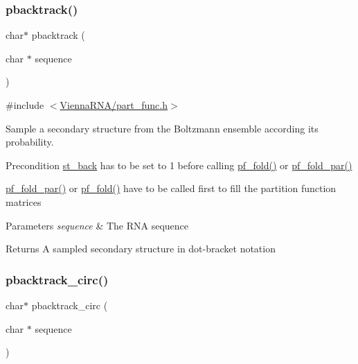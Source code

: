 \subsubsection{\texorpdfstring{pbacktrack()}{pbacktrack()}}
{\footnotesize\ttfamily char$\ast$ pbacktrack (\begin{DoxyParamCaption}\item[{char $\ast$}]{sequence }\end{DoxyParamCaption})}



{\ttfamily \#include $<$\hyperlink{part__func_8h}{Vienna\+R\+N\+A/part\+\_\+func.\+h}$>$}



Sample a secondary structure from the Boltzmann ensemble according its probability. 

\begin{DoxyPrecond}{Precondition}
\hyperlink{group__subopt__stochbt_gacd79b1a570e6ad9be24cb11fe8cae30a}{st\+\_\+back} has to be set to 1 before calling \hyperlink{group__pf__fold_gadc3db3d98742427e7001a7fd36ef28c2}{pf\+\_\+fold()} or \hyperlink{group__pf__fold_gac4f95bee734b2563a3d6e9932117ebdf}{pf\+\_\+fold\+\_\+par()} 

\hyperlink{group__pf__fold_gac4f95bee734b2563a3d6e9932117ebdf}{pf\+\_\+fold\+\_\+par()} or \hyperlink{group__pf__fold_gadc3db3d98742427e7001a7fd36ef28c2}{pf\+\_\+fold()} have to be called first to fill the partition function matrices
\end{DoxyPrecond}

\begin{DoxyParams}{Parameters}
{\em sequence} & The R\+NA sequence \\
\hline
\end{DoxyParams}
\begin{DoxyReturn}{Returns}
A sampled secondary structure in dot-\/bracket notation 
\end{DoxyReturn}
\mbox{\label{group__subopt__stochbt_ga00474051204ac9ad576b3e45174d03ff}} 
\subsubsection{\texorpdfstring{pbacktrack\+\_\+circ()}{pbacktrack\_circ()}}
{\footnotesize\ttfamily char$\ast$ pbacktrack\+\_\+circ (\begin{DoxyParamCaption}\item[{char $\ast$}]{sequence }\end{DoxyParamCaption})}



